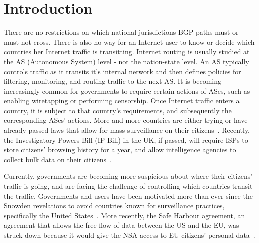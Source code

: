 \section{Introduction}
\label{intro}

There are no restrictions on which national jurisdictions BGP paths must or must not cross.  There is also no way for an Internet user to know or decide which countries her Internet traffic is transitting.  Internet routing is usually studied at the AS (Autonomous System) level - not the nation-state level.  An AS typically controls traffic as it transits it's internal network and then defines policies for filtering, monitoring, and routing traffic to the next AS.  It is becoming increasingly common for governments to require certain actions of ASes, such as enabling wiretapping or performing censorship.  Once Internet traffic enters a country, it is subject to that country's requirements, and subsequently the corresponding ASes' actions.  More and more countries are either trying or have already passed laws that allow for mass surveillance on their citizens~\cite{france_surveillance, netherlands_surveillance, kazak_surveillance}.  Recently, the Investigatory Powers Bill (IP Bill) in the UK, if passed, will require ISPs to store citizens' browsing history for a year, and allow intelligence agencies to collect bulk data on their citizens~\cite{uk_bill}.

Currently, governments are becoming more suspicious about where their citizens' traffic is going, and are facing the challenge of controlling which countries transit the traffic.  Governments and users have been motivated more than ever since the Snowden revelations to avoid countries known for surveillance practices, specifically the United States~\cite{russia_secure_internet, routing_errors, dte}.  More recently, the Safe Harbour agreement, an agreement that allows the free flow of data between the US and the EU, was struck down because it would give the NSA access to EU citizens' personal data~\cite{safe_harbour_illegal, safe_harbour_undecided}.

